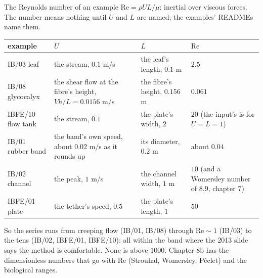 \documentclass[aspectratio=169,11pt]{beamer}
\begin{document}
\begin{frame}{The Reynolds number of an example}
\label{fr:re}
\small $\mathrm{Re} = \rho U L/\mu$: inertial over viscous forces. The number means nothing until $U$ and $L$ are named; the examples' READMEs name them.
\vspace{1mm}

\scriptsize
\begin{tabular}{@{}L{0.17\textwidth}L{0.28\textwidth}L{0.2\textwidth}L{0.25\textwidth}@{}}
\toprule
example & $U$ & $L$ & $\mathrm{Re}$\\
\midrule
IB/03 leaf & the stream, $0.1$ m/s & the leaf's length, $0.1$ m & $2.5$\\
IB/08 glycocalyx & the shear flow at the fibre's height, $Vh/L = 0.0156$ m/s & the fibre's height, $0.156$ m & $0.061$\\
IBFE/10 flow tank & the stream, $0.1$ & the plate's width, $2$ & $20$ (the input's  is for $U = L = 1$)\\
IB/01 rubber band & the band's own speed, about $0.02$ m/s as it rounds up & its diameter, $0.2$ m & about $0.04$\\
IB/02 channel & the peak, $1$ m/s & the channel width, $1$ m & $10$ (and a Womersley number of $8.9$, chapter 7)\\
IBFE/01 plate & the tether's speed, $0.5$ & the plate's length, $1$ & $50$\\
\bottomrule
\end{tabular}

\vspace{2mm}
\small So the series runs from creeping flow (IB/01, IB/08) through $\mathrm{Re} \sim 1$ (IB/03) to the tens (IB/02, IBFE/01, IBFE/10): all within the band where the 2013 slide says the method is comfortable. None is above $1000$. Chapter 8b has the dimensionless numbers that go with $\mathrm{Re}$ (Strouhal, Womersley, P\'eclet) and the biological ranges.
\end{frame}
\end{document}
